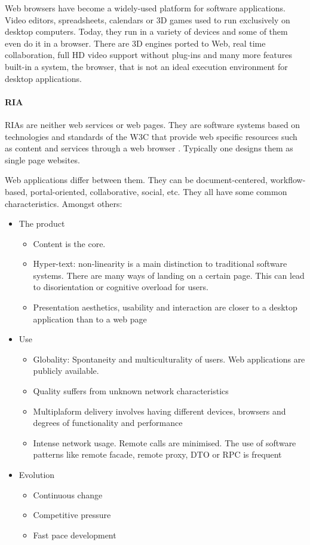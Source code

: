 Web browsers have become a widely-used platform for software applications. 
Video editors, spreadsheets, calendars or 3D games used to run exclusively on desktop computers. 
Today, they run in a variety of devices and some of them even do it in a browser. 
There are 3D engines ported to Web, real time collaboration, full HD video support without plug-ins and many more features built-in a system, the browser, that is not an ideal execution environment for desktop applications.

\paragraph{\ac{RIA}}
\acp{RIA} are neither web services or web pages. 
They are software systems based on technologies and standards of the \ac{W3C} that provide web specific resources such as content and services through a web browser \cite{Kappel:2006}.
Typically one designs them as single page websites.

Web applications differ between them. 
They can be document-centered, workflow-based, portal-oriented, collaborative, social, etc. 
They all have some common characteristics. 
Amongst others:
\begin{itemize}
    \item The product
    \begin{itemize}
        \item Content is the core.
        \item Hyper-text: non-linearity is a main distinction to traditional software systems. There are many ways of landing on a certain page. This can lead to disorientation or cognitive overload for users.
        \item Presentation aesthetics, usability and interaction are closer to a desktop application than to a web page
    \end{itemize}
    \item Use
    \begin{itemize}
        \item Globality: Spontaneity and multiculturality of users. Web applications are publicly available.
        \item Quality suffers from unknown network characteristics
        \item Multiplaform delivery involves having different devices, browsers and degrees of functionality and performance
        \item Intense network usage. Remote calls are minimised. The use of software patterns like remote facade, remote proxy, \ac{DTO} or \ac{RPC} is frequent
    \end{itemize}
    \item Evolution
    \begin{itemize}
         \item Continuous change
         \item Competitive pressure
         \item Fast pace development
    \end{itemize}   
\end{itemize}

